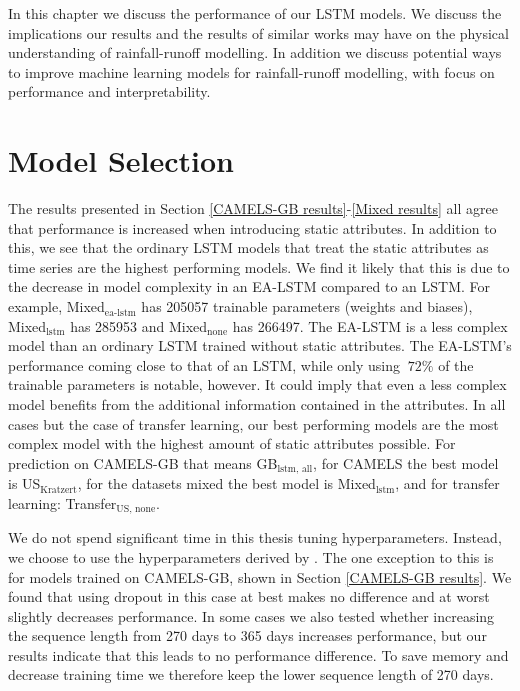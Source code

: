 In this chapter we discuss the performance of our LSTM models. We discuss the implications 
our results and the results of similar works may have on the physical understanding 
of rainfall-runoff modelling. In addition we discuss potential ways to improve machine 
learning models for rainfall-runoff modelling, with focus on performance and 
interpretability.
\section{Model Selection}
\label{discuss model selection}
The results presented in Section \ref{CAMELS-GB results}-\ref{Mixed results} 
all agree that performance is increased when introducing static attributes. In 
addition to this, we see that the ordinary LSTM models that treat the static 
attributes as time series are the highest performing models. We find it likely that 
this is due  to the decrease in model complexity in an EA-LSTM compared to an LSTM. 
For example, Mixed$_\text{ea-lstm}$ has 205057 trainable parameters (weights and 
biases), Mixed$_\text{lstm}$ has 285953 and Mixed$_\text{none}$ has 266497. The 
EA-LSTM is a less complex model than an ordinary LSTM trained without 
static attributes. The EA-LSTM's performance coming close to that of an 
LSTM, while only using $~72\%$ of the trainable parameters is notable, however. 
It could imply 
that even a less complex model benefits from the additional information 
contained in the attributes. 
In all cases but the case of transfer learning, our best performing models are the 
most complex model with the highest amount of static attributes possible. For 
prediction on CAMELS-GB that means GB$_\text{lstm, all}$, for CAMELS the best model 
is US$_\text{Kratzert}$, for the datasets mixed the best model is Mixed$_\text{lstm}$, 
and for transfer learning: Transfer$_\text{US, none}$.

We do not spend significant time in this thesis tuning hyperparameters. Instead, 
we choose to use the hyperparameters derived by \citet{lstm_second_paper}. The one 
exception to this is for models trained on CAMELS-GB, shown in Section 
\ref{CAMELS-GB results}. We found 
that using dropout in this case at best makes no difference and at worst slightly 
decreases performance. In some cases we also tested whether increasing the 
sequence length from 270 days to 365 days increases performance, but our results 
indicate that this leads to no performance difference. To save memory and decrease 
training time we therefore keep the lower sequence length of 270 days.

